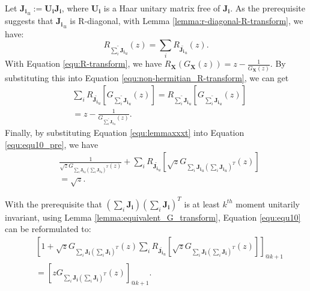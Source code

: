 \documentclass[10pt,journal,compsoc]{IEEEtran}
\begin{document}
Let $\mathbf{J_i}_u := \mathbf{U_i}\mathbf{J_i}$, where $\mathbf{U_i}$ is a Haar unitary matrix free of $\mathbf{J_i}$. As the prerequisite suggests that $\mathbf{J_i}_u$ is R-diagonal, with Lemma \ref{lemma:r-diagonal-R-transform}, we have:
\begin{equation}
    R_{\widetilde{\sum_{i}\mathbf{J_i}_u}}(z) = \sum_{i}R_{\widetilde{\mathbf{J_i}_u}}(z).
\label{equ:non-hermitian_R-transform}
\end{equation}
With Equation \eqref{equ:R-transform}, we have $R_{\mathbf{X}}(G_{\mathbf{X}}(z)) = z-\frac{1}{G_{\mathbf{X}}(z)}$. By substituting this into Equation \eqref{equ:non-hermitian_R-transform}, we can get
\begin{equation}
\begin{split}
    &\sum_{i}R_{\widetilde{\mathbf{J_i}_u}}\left[G_{\widetilde{\sum_{i}\mathbf{J_i}_u}}(z)\right] = R_{\widetilde{\sum_{i}\mathbf{J_i}_u}}\left[G_{\widetilde{\sum_{i}\mathbf{J_i}_u}}(z)\right]\\
    & = z - \frac{1}{G_{\widetilde{\sum_{i}\mathbf{J_i}_u}}(z)}.
\end{split}
\label{equ:equ10_pre}
\end{equation}
Finally, by substituting Equation \eqref{equ:lemmaxxxt} into Equation \eqref{equ:equ10_pre}, we have
\begin{equation}
\begin{split}
    & \frac{1}{\sqrt{z}G_{\sum_{i}\mathbf{J_i}_u(\sum_{i}\mathbf{J_i}_u)^T}(z)} + \sum_{i}R_{\widetilde{\mathbf{J_i}_u}}\left[\sqrt{z}G_{\sum_{i}\mathbf{J_i}_u(\sum_{i}\mathbf{J_i}_u)^T}(z)\right]\\
    & = \sqrt{z}.
\end{split}
\label{equ:equ10}
\end{equation}

With the prerequisite that $(\sum_{i}\mathbf{J_i})(\sum_{i}\mathbf{J_i})^T$ is at least $k^{th}$ moment unitarily invariant, using Lemma \ref{lemma:equivalent_G_transform}, Equation \eqref{equ:equ10} can be reformulated to:
\begin{equation}
\begin{split}
    &\left[\!1\! +\! \sqrt{z}G_{\sum_{i}\!\mathbf{J_i}(\!\sum_{i}\!\mathbf{J_i}\!)^T}\!(z)\!\sum_{i}\!R_{\widetilde{\mathbf{J_i}_u}}\!\left[\!\sqrt{z}G_{\sum_{i}\mathbf{J_i}(\sum_{i}\mathbf{J_i})^T}(z)\!\right]\!\right]_{@k+1}\\
    & = \left[zG_{\sum_{i}\mathbf{J_i}(\sum_{i}\mathbf{J_i})^T}(z)\right]_{@k+1}.
\end{split}
\label{equ:equ10@k}
\end{equation}
\end{document}
